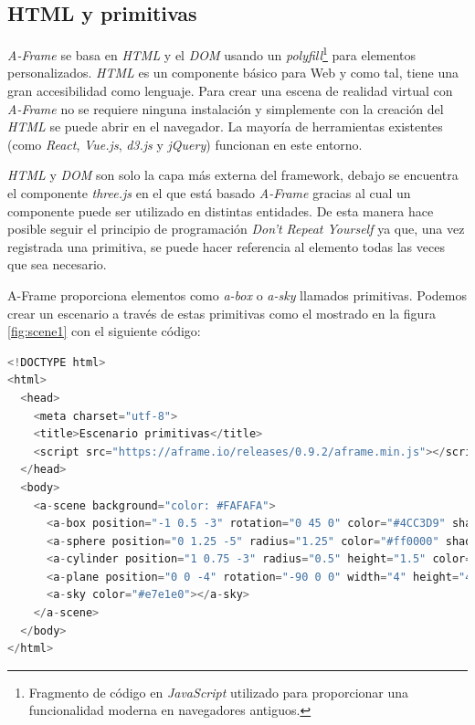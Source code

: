 \subsection{HTML y primitivas}
\textit{A-Frame }se basa en \textit{HTML} y el \textit{DOM} usando un \textit{polyfill}\footnote{Fragmento de código en \textit{JavaScript} utilizado para proporcionar una funcionalidad moderna en navegadores antiguos.} para elementos personalizados. \textit{HTML} es un componente básico para Web y como tal, tiene una gran accesibilidad como lenguaje. Para crear una escena de realidad virtual con \textit{A-Frame} no se requiere ninguna instalación y simplemente con la creación del \textit{HTML} se puede abrir en el navegador. La mayoría de herramientas existentes (como \textit{React}, \textit{Vue.js}, \textit{d3.js} y \textit{jQuery}) funcionan en este entorno. 

\textit{HTML} y \textit{DOM} son solo la capa más externa del framework, debajo se encuentra el componente \textit{three.js} en el que está basado \textit{A-Frame} gracias al cual un componente puede ser utilizado en distintas entidades. De esta manera hace posible seguir el principio de programación \textit{Don't Repeat Yourself} ya que, una vez registrada una primitiva, se puede hacer referencia al elemento todas las veces que sea necesario.  

A-Frame proporciona elementos como \textit{a-box} o \textit{a-sky} llamados primitivas. Podemos crear un escenario a través de estas primitivas como el mostrado en la figura \ref{fig:scene1} con el siguiente código: 

\begin{lstlisting}[language=javascript, caption=Código con primitivas que representa un escenario]
<!DOCTYPE html>
<html>
  <head>
    <meta charset="utf-8">
    <title>Escenario primitivas</title>
    <script src="https://aframe.io/releases/0.9.2/aframe.min.js"></script>
  </head>
  <body>
    <a-scene background="color: #FAFAFA">
      <a-box position="-1 0.5 -3" rotation="0 45 0" color="#4CC3D9" shadow></a-box>
      <a-sphere position="0 1.25 -5" radius="1.25" color="#ff0000" shadow></a-sphere>
      <a-cylinder position="1 0.75 -3" radius="0.5" height="1.5" color="#FFC65D" shadow></a-cylinder>
      <a-plane position="0 0 -4" rotation="-90 0 0" width="4" height="4" color=" #1cde83" shadow></a-plane>
      <a-sky color="#e7e1e0"></a-sky>
    </a-scene>
  </body>
</html>
\end{lstlisting}

